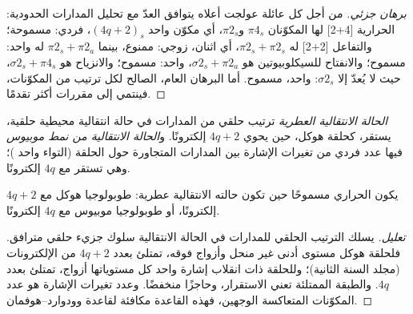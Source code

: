\begin{proof}[برهان جزئي]
من أجل كل عائلة عولجت أعلاه يتوافق العدّ مع تحليل
المدارات الحدودية:  الحرارية [4+2] لها المكوّنان $\pi4_s$ و$\pi2_s$، أي مكوّن واحد $(4q + 2)_s$،
فردي: مسموحة؛ والتفاعل [2+2] له $\pi2_s + \pi2_s$، أي اثنان، زوجي: ممنوع، بينما
$\pi2_s + \pi2_a$ له واحد: مسموح؛ والانفتاح  للسيكلوبيوتين هو $\sigma2_s + \pi2_a$، واحد:
مسموح؛ والانزياح   هو $\sigma2_s + \pi4_s$، حيث لا يُعدّ إلا $\sigma2_s$: واحد،
مسموح. أما البرهان العام، الصالح لكل ترتيب من المكوّنات، فينتمي
إلى مقررات أكثر تقدمًا.
\end{proof}

\begin{definition}\label{def:b3:pericyclic:mobius}
\emph{الحالة الانتقالية العطرية} ترتيب
حلقي من المدارات في حالة انتقالية محيطية حلقية، يستقر، كحلقة هوكل،
حين يحوي $4q + 2$ إلكترونًا. و\emph{الحالة الانتقالية من نمط
موبيوس} فيها عدد فردي من تغيرات الإشارة بين
المدارات المتجاورة حول الحلقة (التواء واحد )؛ وهي
تستقر مع $4q$ إلكترونًا.
\end{definition}

\begin{proposition}\label{prop:b3:pericyclic:aromatic-ts}
يكون  الحراري مسموحًا حين تكون حالته الانتقالية عطرية:
طوبولوجيا هوكل مع $4q + 2$ إلكترونًا، أو طوبولوجيا موبيوس مع $4q$ إلكترونًا.
\end{proposition}

\begin{proof}[تعليل]
يسلك الترتيب الحلقي للمدارات في الحالة الانتقالية سلوك جزيء حلقي
مترافق. فلحلقة هوكل مستوى أدنى غير منحل وأزواج
فوقه، تمتلئ بعدد $4q + 2$ من الإلكترونات (مجلد السنة الثانية)؛ وللحلقة ذات انقلاب
إشارة واحد كل مستوياتها أزواج، تمتلئ بعدد $4q$. والطبقة الممتلئة تعني
الاستقرار،  وحاجزًا منخفضًا. وعدد تغيرات
الإشارة هو عدد المكوّنات المتعاكسة الوجهين، فهذه القاعدة مكافئة
لقاعدة وودوارد--هوفمان.
\end{proof}

